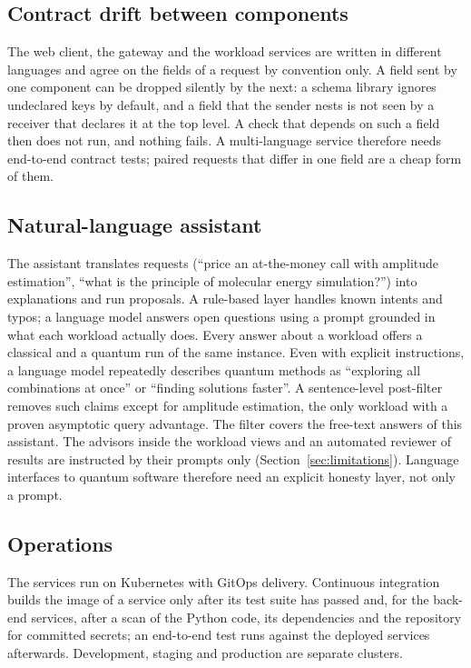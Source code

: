 \documentclass[11pt,a4paper]{article}
\begin{document}
\subsection{Contract drift between components}

The web client, the gateway and the workload services are written in
different languages and agree on the fields of a request by convention only.
A field sent by one component can be dropped silently by the next: a schema
library ignores undeclared keys by default, and a field that the sender
nests is not seen by a receiver that declares it at the top level. A check
that depends on such a field then does not run, and nothing fails. A
multi-language service therefore needs end-to-end contract tests; paired
requests that differ in one field are a cheap form of them.

\subsection{Natural-language assistant}
\label{sec:assistant}

The assistant translates requests (``price an at-the-money call with
amplitude estimation'', ``what is the principle of molecular energy
simulation?'') into explanations and run proposals. A rule-based layer handles
known intents and typos; a language model answers open questions using a
prompt grounded in what each workload actually does. Every answer about a
workload offers a classical and a quantum run of the same instance. Even with
explicit instructions, a language model repeatedly describes quantum methods as
``exploring all combinations at once'' or ``finding solutions faster''. A
sentence-level post-filter removes such claims except for amplitude
estimation, the only workload with a proven asymptotic query advantage.
The filter covers the free-text answers of this assistant. The advisors
inside the workload views and an automated reviewer of results are
instructed by their prompts only
(Section~\ref{sec:limitations}).
Language interfaces to quantum software therefore need an explicit
honesty layer, not only a prompt.

\subsection{Operations}

The services run on Kubernetes with GitOps delivery. Continuous integration
builds the image of a service only after its test suite has passed and, for
the back-end services, after a scan of the Python code, its dependencies and
the repository for committed secrets; an end-to-end test runs against the
deployed services afterwards. Development, staging and production are
separate clusters.
\end{document}
